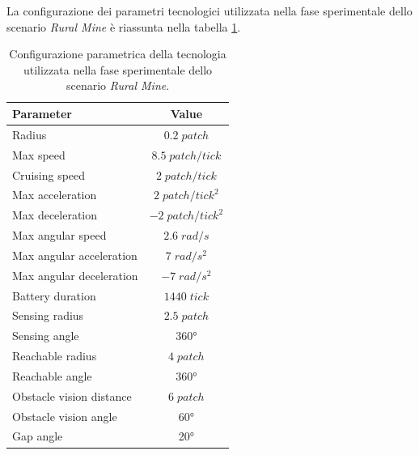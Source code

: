 La configurazione dei parametri tecnologici utilizzata nella fase sperimentale dello scenario \textit{Rural Mine} è  riassunta nella tabella \ref{tabella_parametri_ruralMine}.

\begin{table}[H]
    \centering
    \captionsetup{justification=centering, margin=2cm, font=footnotesize}
    \begin{tabular}{|l|c|}
    \hline
    \textbf{Parameter}              & \textbf{Value}                \\ \hline
    Radius                          & $0.2 \; patch$                \\ \hline
    Max speed                       & $8.5 \; patch/tick$           \\ \hline
    Cruising speed                  & $2 \; patch/tick$             \\ \hline
    Max acceleration                & $2 \; patch/tick^{2}$         \\ \hline
    Max deceleration                & $-2 \; patch/tick^{2}$        \\ \hline
    Max angular speed               & $2.6 \; rad/s$                \\ \hline
    Max angular acceleration        & $7 \; rad/s^{2}$              \\ \hline
    Max angular deceleration        & $-7 \; rad/s^{2}$             \\ \hline
    Battery duration                & $1440 \; tick$                \\ \hline
    Sensing radius                  & $2.5 \; patch$                \\ \hline
    Sensing angle                   & \ang{360}                        \\ \hline
    Reachable radius                & $4 \; patch$                  \\ \hline
    Reachable angle                 & \ang{360}                        \\ \hline
    Obstacle vision distance        & $6 \; patch$                  \\ \hline
    Obstacle vision angle           & \ang{60}                        \\ \hline
    Gap angle                       & \ang{20}                        \\ \hline
    \end{tabular}%
    
    \caption{Configurazione parametrica della tecnologia utilizzata nella fase sperimentale dello scenario \textit{Rural Mine}.}
    \label{tabella_parametri_ruralMine}
\end{table}

